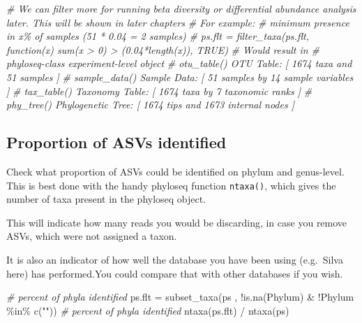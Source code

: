 \documentclass[
]{book}
\newenvironment{Shaded}{\begin{snugshade}}{\end{snugshade}}
\newcommand{\CommentTok}[1]{\textcolor[rgb]{0.56,0.35,0.01}{\textit{#1}}}
\newcommand{\FunctionTok}[1]{\textcolor[rgb]{0.00,0.00,0.00}{#1}}
\newcommand{\NormalTok}[1]{#1}
\newcommand{\OtherTok}[1]{\textcolor[rgb]{0.56,0.35,0.01}{#1}}
\newcommand{\SpecialCharTok}[1]{\textcolor[rgb]{0.00,0.00,0.00}{#1}}
\newcommand{\StringTok}[1]{\textcolor[rgb]{0.31,0.60,0.02}{#1}}
\begin{document}
\begin{Shaded}
\begin{Highlighting}[]
\CommentTok{\# We can filter more for running beta diversity or differential abundance analysis later. This will be shown in later chapters}
\CommentTok{\# For example: }
\CommentTok{\# minimum presence in x\% of samples (51 * 0.04 = 2 samples)}
\CommentTok{\# ps.flt = filter\_taxa(ps.flt, function(x) sum(x \textgreater{} 0) \textgreater{} (0.04*length(x)), TRUE) }
\CommentTok{\# Would result in }
\CommentTok{\# phyloseq{-}class experiment{-}level object}
\CommentTok{\# otu\_table()   OTU Table:         [ 1674 taxa and 51 samples ]}
\CommentTok{\# sample\_data() Sample Data:       [ 51 samples by 14 sample variables ]}
\CommentTok{\# tax\_table()   Taxonomy Table:    [ 1674 taxa by 7 taxonomic ranks ]}
\CommentTok{\# phy\_tree()    Phylogenetic Tree: [ 1674 tips and 1673 internal nodes ]}
\end{Highlighting}
\end{Shaded}

\hfill\break

\hypertarget{proportion-of-asvs-identified}{%
\subsection{Proportion of ASVs identified}\label{proportion-of-asvs-identified}}

Check what proportion of ASVs could be identified on phylum and genus-level. This is best done with the handy phyloseq function \texttt{ntaxa()}, which gives the number of taxa present in the phyloseq object.

This will indicate how many reads you would be discarding, in case you remove ASVs, which were not assigned a taxon.

It is also an indicator of how well the database you have been using (e.g.~Silva here) has performed.You could compare that with other databases if you wish.

\begin{Shaded}
\begin{Highlighting}[]
\CommentTok{\#  percent of phyla identified}
\NormalTok{ps.flt  }\OtherTok{=} \FunctionTok{subset\_taxa}\NormalTok{(ps , }\SpecialCharTok{!}\FunctionTok{is.na}\NormalTok{(Phylum) }\SpecialCharTok{\&} \SpecialCharTok{!}\NormalTok{Phylum }\SpecialCharTok{\%in\%} \FunctionTok{c}\NormalTok{(}\StringTok{""}\NormalTok{))}
\CommentTok{\# percent of phyla identified}
\FunctionTok{ntaxa}\NormalTok{(ps.flt) }\SpecialCharTok{/} \FunctionTok{ntaxa}\NormalTok{(ps)}
\end{Highlighting}
\end{Shaded}
\end{document}
